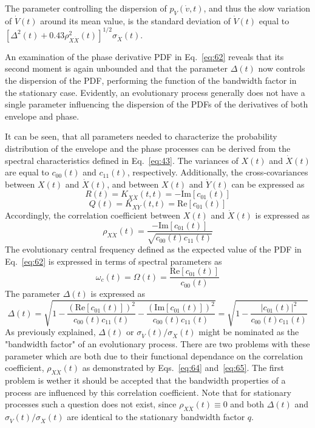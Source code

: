 \documentclass{article}
\begin{document}
The parameter controlling the dispersion of $p_{\dot{V}} (\dot{v}, t)$, and
thus the slow variation of $\dot{V} (t)$ around its mean value, is the
standard deviation of $\dot{V} (t)$ equal to $[\Delta^2 (t) + 0.43 \rho_{X
\dot{X}}^2 (t)]^{1 / 2} \sigma_{\dot{X}} (t)$.

An examination of the phase derivative PDF in Eq.~\eqref{eq:62} reveals that
its second moment is again unbounded and that the parameter $\Delta (t)$ now
controls the dispersion of the PDF, performing the function of the bandwidth
factor in the stationary case. Evidently, an evolutionary process generally
does not have a single parameter influencing the dispersion of the PDFs of the
derivatives of both envelope and phase.

It can be seen, that all parameters needed to characterize the probability
distribution of the envelope and the phase processes can be derived from the
spectral characteristics defined in Eq.~\eqref{eq:43}. The variances of $X
(t)$ and $\dot{X} (t)$ are equal to $c_{00} (t)$ and $c_{11} (t)$,
respectively. Additionally, the cross-covariances between $X (t)$ and $\dot{X}
(t)$, and between $X (t)$ and $\dot{Y} (t)$ can be expressed as
\begin{equation}
  R (t) = K_{X \dot{X}} (t, t) = - \mathrm{Im} [c_{01} (t)] \label{eq:66}
\end{equation}
\begin{equation}
  Q (t) = K_{X \dot{Y}} (t, t) = \mathrm{Re} [c_{01} (t)]
\end{equation}
Accordingly, the correlation coefficient between $X (t)$ and $\dot{X} (t)$ is
expressed as
\begin{equation}
  \rho_{X \dot{X}} (t) = \frac{- \mathrm{Im} [c_{01} (t)]}{\sqrt{c_{00} (t)
  c_{11} (t)}} \label{eq:67}
\end{equation}
The evolutionary central frequency defined as the expected value of the PDF in
Eq.~\eqref{eq:62} is expressed in terms of spectral parameters as
\begin{equation}
  \omega_c (t) = \Omega (t) = \frac{\mathrm{Re} [c_{01} (t)]}{c_{00} (t)}
  \label{eq:68}
\end{equation}
The parameter $\Delta (t)$ is expressed as
\begin{equation}
  \Delta (t) = \sqrt{1 - \frac{(\mathrm{Re} [c_{01} (t)])^2}{c_{00} (t) c_{11}
  (t)} - \frac{(\mathrm{Im} [c_{01} (t)])^2}{c_{00} (t) c_{11} (t)}} = \sqrt{1
  - \frac{| c_{01} (t) |^2}{c_{00} (t) c_{11} (t)}} \label{eq:69}
\end{equation}
As previously explained, $\Delta (t)$ or $\sigma_{\dot{V}} (t) /
\sigma_{\dot{X}} (t)$ might be nominated as the "bandwidth factor" of an
evolutionary process. There are two problems with these parameter which are
both due to their functional dependance on the correlation coefficient,
$\rho_{X \dot{X}} (t)$ as demonstrated by Eqs.~\eqref{eq:64}
and~\eqref{eq:65}. The first problem is wether it should be accepted that the
bandwidth properties of a process are influenced by this correlation
coefficient. Note that for stationary processes such a question does not
exist, since $\rho_{X \dot{X}} (t) \equiv 0$ and both $\Delta (t)$ and
$\sigma_{\dot{V}} (t) / \sigma_{\dot{X}} (t)$ are identical to the stationary
bandwidth factor $q$.
\end{document}
